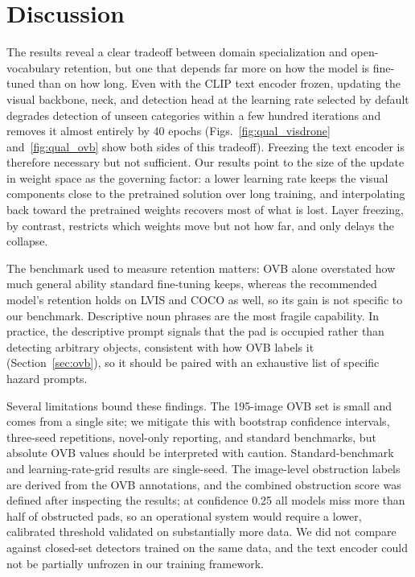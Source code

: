 \documentclass[conf]{new-aiaa}
\begin{document}
\section{Discussion}

The results reveal a clear tradeoff between domain specialization and open-vocabulary
retention, but one that depends far more on how the model is fine-tuned than on how long.
Even with the CLIP text encoder frozen, updating the visual backbone, neck, and detection head
at the learning rate selected by default degrades detection of unseen categories within a few
hundred iterations and removes it almost entirely by 40 epochs
(Figs.~\ref{fig:qual_visdrone} and~\ref{fig:qual_ovb} show both sides of this tradeoff).
Freezing the text encoder is therefore necessary but not sufficient. Our results point to the
size of the update in weight space as the governing factor: a lower learning rate keeps the
visual components close to the pretrained solution over long training, and interpolating back
toward the pretrained weights recovers most of what is lost. Layer freezing, by contrast,
restricts which weights move but not how far, and only delays the collapse.

The benchmark used to measure retention matters: OVB alone overstated how much general ability
standard fine-tuning keeps, whereas the recommended model's retention holds on LVIS and COCO as
well, so its gain is not specific to our benchmark. Descriptive noun phrases are the most
fragile capability. In practice, the descriptive prompt signals that the pad is occupied
rather than detecting arbitrary objects, consistent with how OVB labels it
(Section~\ref{sec:ovb}), so it should be paired with an exhaustive list of specific hazard
prompts.

Several limitations bound these findings. The 195-image OVB set is small and comes from a
single site; we mitigate this with bootstrap confidence intervals, three-seed repetitions,
novel-only reporting, and standard benchmarks, but absolute OVB values should be interpreted
with caution. Standard-benchmark and learning-rate-grid results are single-seed. The
image-level obstruction labels are derived from the OVB annotations, and the combined
obstruction score was defined after inspecting the results; at confidence 0.25 all models
miss more than half of obstructed pads, so an operational system would require a lower,
calibrated threshold validated on substantially more data. We did not compare against
closed-set detectors trained on the same data, and the text encoder could not be partially
unfrozen in our training framework.
\end{document}
